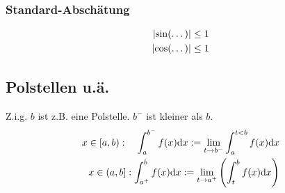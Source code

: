 \subsubsection{Standard-Abschätung}
\begin{align*}
\lvert \sin({\dots)}\rvert&\leq1\\
\lvert \cos({\dots)}\rvert&\leq1\\
\end{align*}

\subsection{Polstellen u.ä.}
Z.i.g. $b$ ist z.B. eine Polstelle. $b^-$ ist kleiner als $b$.
\begin{align}
x\in\left[a,b\right):\quad \int^{b^-}_a f(x)\mathrm{d}x:=\lim_{t\rightarrow b^-} \int^{t<b}_af(x)\mathrm{d}x\\
x\in\left(a,b\right]:\int^b_{a^+}f(x)\mathrm{d}x:= \lim_{t\rightarrow a^+}\left(\int^b_tf(x)\mathrm{d}x\right)
\end{align}
